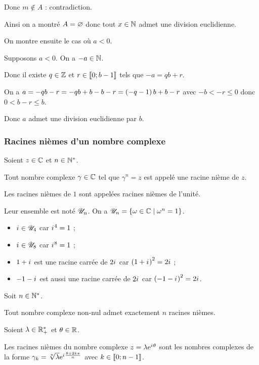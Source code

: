 \begin{dem}
\begin{itemize}
Donc \(m\not\in A\) : contradiction.
\end{itemize}

Ainsi on a montré \(A=\varnothing\) donc tout \(x\in\mathbb{N}\) admet une division euclidienne.

On montre ensuite le cas où \(a<0\).

Supposons \(a<0\). On a \(-a\in\mathbb{N}\).

Donc il existe \(q\in\mathbb{Z}\) et \(r\in\left\llbracket0;b-1\right\rrbracket\) tels que \(-a=qb+r\).

On a \(a=-qb-r=-qb+b-b-r=\left(-q-1\right)b+b-r\) avec \(-b<-r\leq0\) donc \(0<b-r\leq b\).

Donc \(a\) admet une division euclidienne par \(b\).
\end{dem}

\subsubsection{Racines nièmes d'un nombre complexe}

\begin{defi}
Soient \(z\in\mathbb{C}\) et \(n\in\mathbb{N}^*\).

Tout nombre complexe \(\gamma\in\mathbb{C}\) tel que \(\gamma^n=z\) est appelé une racine nième de \(z\).

Les racines nièmes de \(1\) sont appelées racines nièmes de l'unité.

Leur ensemble est noté \(\mathscr{U}_n\). On a \(\mathscr{U}_n=\left\lbrace\omega\in\mathbb{C}\;\middle|\;\omega^n=1\right\rbrace\).
\end{defi}

\begin{ex}
\begin{itemize}
\item \(i\mkern1mu\in\mathscr{U}_4\) car \(i\mkern1mu^4=1\) ;

\item \(i\mkern1mu\in\mathscr{U}_8\) car \(i\mkern1mu^8=1\) ;

\item \(1+i\mkern1mu\) est une racine carrée de \(2i\mkern1mu\) car \(\left(1+i\mkern1mu\right)^2=2i\mkern1mu\) ;

\item \(-1-i\mkern1mu\) est aussi une racine carrée de \(2i\mkern1mu\) car \(\left(-1-i\mkern1mu\right)^2=2i\mkern1mu\).
\end{itemize}
\end{ex}

\begin{theo}
Soit \(n\in\mathbb{N}^*\).

Tout nombre complexe non-nul admet exactement \(n\) racines nièmes.

Soient \(\lambda\in\mathbb{R}_+^*\) et \(\theta\in\mathbb{R}\).

Les racines nièmes du nombre complexe \(z=\lambda\mathrm{e}^{i\mkern1mu\theta}\) sont les nombres complexes de la forme \(\gamma_k=\sqrt[n]{\lambda}\mathrm{e}^{i\mkern1mu\frac{\theta+2k\pi}{n}}\) avec \(k\in\left\llbracket0;n-1\right\rrbracket\).
\end{theo}

